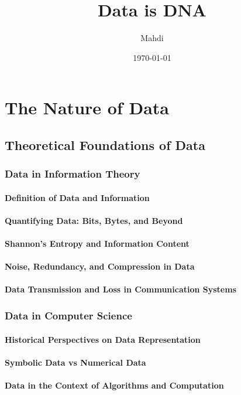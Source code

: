 \documentclass[12pt, oneside]{book}
\title{{\Huge Data is DNA}}
\author{{\LARGE Mahdi}}
\date{{\large \today}}
\begin{document}
	\frontmatter
	\mainmatter
	\maketitle
	\tableofcontents


\chapter{The Nature of Data}
\section{Theoretical Foundations of Data}
\subsection{Data in Information Theory}
\subsubsection{Definition of Data and Information}
\subsubsection{Quantifying Data: Bits, Bytes, and Beyond}
\subsubsection{Shannon's Entropy and Information Content}
\subsubsection{Noise, Redundancy, and Compression in Data}
\subsubsection{Data Transmission and Loss in Communication Systems}
\subsection{Data in Computer Science}
\subsubsection{Historical Perspectives on Data Representation}
\subsubsection{Symbolic Data vs Numerical Data}
\subsubsection{Data in the Context of Algorithms and Computation}
\end{document}
